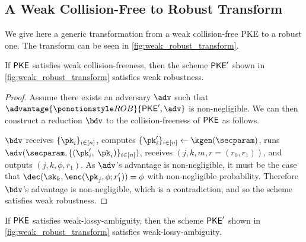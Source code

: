 \subsection{A Weak Collision-Free to Robust Transform}

We give here a generic transformation from a weak collision-free PKE to a robust one.
The transform can be seen in \cref{fig:weak_robust_transform}.



\begin{theorem}
	If $\mathsf{PKE}$ satisfies weak collision-freeness, then the scheme $\mathsf{PKE}'$ shown in \cref{fig:weak_robust_transform} satisfies weak robustness.
\end{theorem}

\begin{proof}
	Assume there exists an adversary $\adv$ such that $\advantage{\robust}{\pke', \adv}$ is non-negligible.
	We can then construct a reduction $\bdv$ to the collision-freeness of $\mathsf{PKE}$ as follows.

	$\bdv$ receives $\{\pk_i\}_{i\in[n]}$, computes $\{\pk_i'\}_{i\in [n]} \leftarrow \kgen(\secparam)$, runs $\adv(\secparam, \{(\pk'_i,$ $ \pk_i)\}_{i\in[n]})$, receives $(j, k, m, r = (r_0, r_1))$, and outputs $(j, k, \phi, r_1)$.
	As $\adv$'s advantage is non-negligible, it must be the case that $\dec(\sk_k, \enc(\pk_j, \phi; r_1')) = \phi$ with non-negligible probability.
	Therefore $\bdv$'s advantage is non-negligible, which is a contradiction, and so the scheme satisfies weak robustness.
\end{proof}

\begin{theorem}
	If $\mathsf{PKE}$ satisfies weak-lossy-ambiguity, then the scheme $\mathsf{PKE}'$ shown in \cref{fig:weak_robust_transform} satisfies weak-lossy-ambiguity.
\end{theorem}


